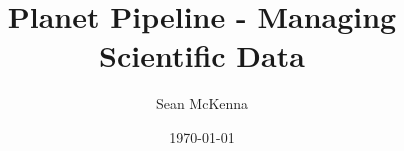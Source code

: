 \documentclass{beamer}
\title{Planet Pipeline - Managing Scientific Data}
\author{Sean McKenna}
\institute[Cornell College]{ Cornell College \\ \medskip {\emph{mckennapsean@gmail.com}} }
\date{\today}
\begin{document}
\begin{frame}
  \titlepage
\end{frame}


%
\end{document}
